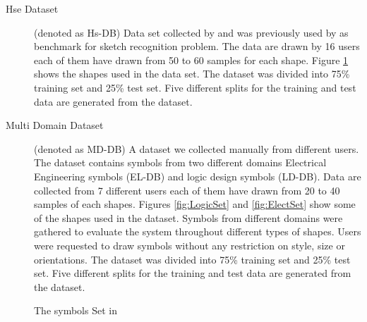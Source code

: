 \begin{description}
	\item [Hse Dataset] (denoted as Hs-DB) Data set collected by \cite{HeloiseBeautification} and was previously used by \cite{Oltmans07} as benchmark for sketch recognition problem. The data are drawn by 16 users each of them have drawn from 50 to 60 samples for each shape. Figure \ref{fig:symbolSet} shows the shapes used in the data set. The dataset was divided into 75\% training set and 25\% test set. Five different splits for the training and test data are generated from the dataset.%
		\item [Multi Domain Dataset] (denoted as MD-DB) A dataset we collected manually from different users. The dataset contains symbols from two different domains Electrical Engineering symbols (EL-DB) and logic design symbols (LD-DB). Data are collected from 7 different users each of them have drawn from 20 to 40 samples of each shapes. Figures \ref{fig:LogicSet} and \ref{fig:ElectSet} show some of the shapes used in the dataset. Symbols from different domains were gathered to evaluate the system throughout different types of shapes. Users were requested to draw symbols without any restriction on style, size or orientations. The dataset was divided into 75\% training set and 25\% test set. Five different splits for the training and test data are generated from the dataset. %
\end{description}

\begin{figure}[]\centering
{}
	\caption[Hs-DB Symbol Set]{The symbols Set in \cite{HeloiseBeautification} } 
	\label{fig:symbolSet}
\end{figure}

